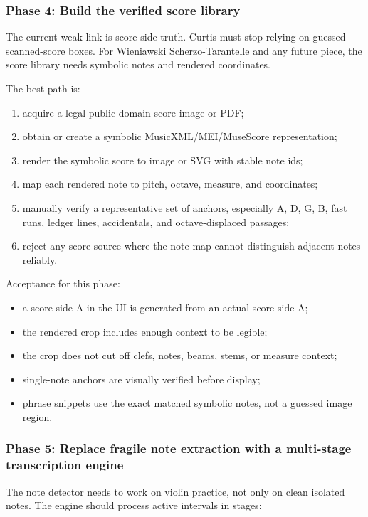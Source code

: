 \subsubsection*{Phase 4: Build the verified score library}

The current weak link is score-side truth. Curtis must stop relying on guessed scanned-score boxes. For Wieniawski Scherzo-Tarantelle and any future piece, the score library needs symbolic notes and rendered coordinates.

The best path is:
\begin{enumerate}
    \item acquire a legal public-domain score image or PDF;
    \item obtain or create a symbolic MusicXML/MEI/MuseScore representation;
    \item render the symbolic score to image or SVG with stable note ids;
    \item map each rendered note to pitch, octave, measure, and coordinates;
    \item manually verify a representative set of anchors, especially A, D, G, B, fast runs, ledger lines, accidentals, and octave-displaced passages;
    \item reject any score source where the note map cannot distinguish adjacent notes reliably.
\end{enumerate}

Acceptance for this phase:
\begin{itemize}
    \item a score-side A in the UI is generated from an actual score-side A;
    \item the rendered crop includes enough context to be legible;
    \item the crop does not cut off clefs, notes, beams, stems, or measure context;
    \item single-note anchors are visually verified before display;
    \item phrase snippets use the exact matched symbolic notes, not a guessed image region.
\end{itemize}

\subsubsection*{Phase 5: Replace fragile note extraction with a multi-stage transcription engine}

The note detector needs to work on violin practice, not only on clean isolated notes. The engine should process active intervals in stages:

